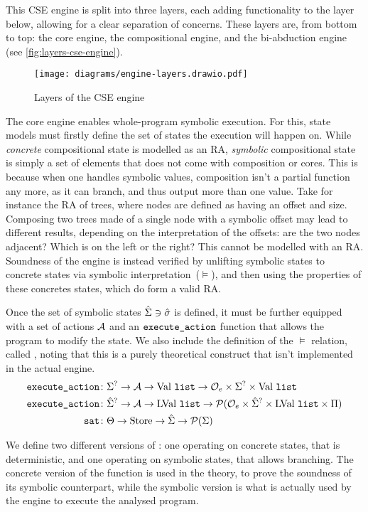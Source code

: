 This CSE engine is split into three layers, each adding functionality to the layer below, allowing for a clear separation of concerns. These layers are, from bottom to top: the core engine, the compositional engine, and the bi-abduction engine (see \autoref{fig:layers-cse-engine}).

\begin{figure}
	\centering
	\texttt{[image: diagrams/engine-layers.drawio.pdf]}
	\caption{Layers of the CSE engine}
	\label{fig:layers-cse-engine}
\end{figure}

The core engine enables whole-program symbolic execution. For this, state models must firstly define the set of states the execution will happen on. While \emph{concrete} compositional state is modelled as an RA, \emph{symbolic} compositional state is simply a set of elements that does not come with composition or cores. This is because when one handles symbolic values, composition isn't a partial function any more, as it can branch, and thus output more than one value. Take for instance the RA of trees, where nodes are defined as having an offset and size. Composing two trees made of a single node with a symbolic offset may lead to different results, depending on the interpretation of the offsets: are the two nodes adjacent? Which is on the left or the right? This cannot be modelled with an RA. Soundness of the engine is instead verified by unlifting symbolic states to concrete states via symbolic interpretation~($\models$), and then using the properties of these concretes states, which do form a valid RA.

Once the set of symbolic states $\hat{\Sigma}\ni\hat{\sigma}$ is defined, it must be further equipped with a set of actions ${\cal{A}}$ and an $\texttt{execute\_action}$ function that allows the program to modify the state. We also include the definition of the $\models$ relation, called , noting that this is a purely theoretical construct that isn't implemented in the actual engine.
\begin{align*}
	\texttt{execute\_action} &\colon \Sigma^? \rightarrow {\ensuremath{\cal{A}}} \rightarrow \text{Val}~\texttt{list} \rightarrow {\cal O}_e \times \Sigma^? \times \text{Val}~\texttt{list}\\
	\texttt{execute\_action} &\colon \hat{\Sigma}^? \rightarrow {\ensuremath{\cal{A}}} \rightarrow \text{LVal}~\texttt{list} \rightarrow {\cal P}({\cal O}_e \times \hat{\Sigma}^? \times \text{LVal}~\texttt{list} \times \Pi) \\
	\texttt{sat} &\colon \Theta \rightarrow \text{Store} \rightarrow \hat{\Sigma} \rightarrow {\cal P}(\Sigma)
\end{align*}

We define two different versions of \execac{}: one operating on concrete states, that is deterministic, and one operating on symbolic states, that allows branching. The concrete version of the function is used in the theory, to prove the soundness of its symbolic counterpart, while the symbolic version is what is actually used by the engine to execute the analysed program.

